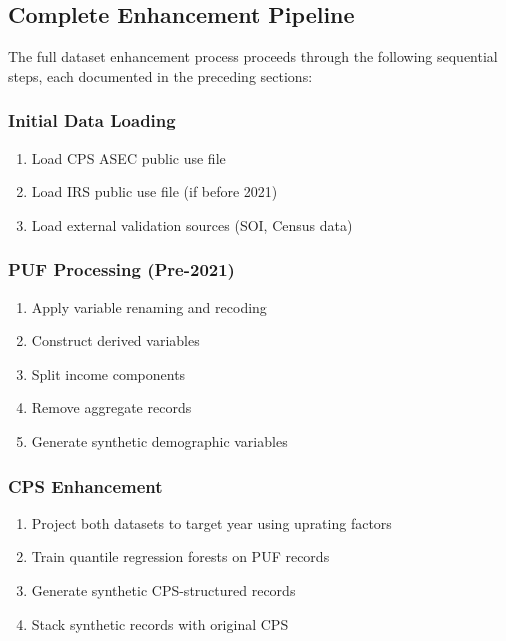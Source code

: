 \subsection{Complete Enhancement Pipeline}

The full dataset enhancement process proceeds through the following sequential steps, each documented in the preceding sections:

\subsubsection{Initial Data Loading}

\begin{enumerate}
    \item Load CPS ASEC public use file
    \item Load IRS public use file (if before 2021)
    \item Load external validation sources (SOI, Census data)
\end{enumerate}

\subsubsection{PUF Processing (Pre-2021)}

\begin{enumerate}
    \item Apply variable renaming and recoding
    \item Construct derived variables
    \item Split income components 
    \item Remove aggregate records
    \item Generate synthetic demographic variables
\end{enumerate}

\subsubsection{CPS Enhancement}

\begin{enumerate}
    \item Project both datasets to target year using uprating factors
    \item Train quantile regression forests on PUF records
    \item Generate synthetic CPS-structured records
    \item Stack synthetic records with original CPS
\end{enumerate}

